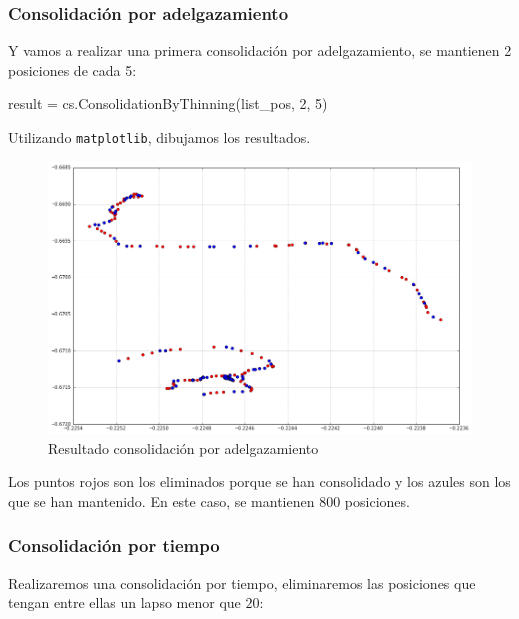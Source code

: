 \documentclass[a4paper, 12pt, spanish]{article}
\begin{document}
\pagebreak
\subsubsection{Consolidaci\'on por adelgazamiento}

Y vamos a realizar una primera consolidaci\'on por adelgazamiento, se mantienen 2 posiciones de cada 5:\\

\begin{python}
result = cs.ConsolidationByThinning(list_pos, 2, 5)
\end{python}

\bigskip

Utilizando \texttt{matplotlib}, dibujamos los resultados.\\

\begin{figure}[H]
	\includegraphics[scale=.45]{../comparativa/thinningSuj1.png}
	\caption{Resultado consolidaci\'on por adelgazamiento}
\end{figure}

Los puntos rojos son los eliminados porque se han consolidado y los azules son los que se han mantenido. En este caso, se mantienen 800 posiciones. \\

\pagebreak
\subsubsection{Consolidaci\'on por tiempo}

Realizaremos una consolidaci\'on por tiempo, eliminaremos las posiciones que tengan entre ellas un lapso menor que $20$:\\
\end{document}
